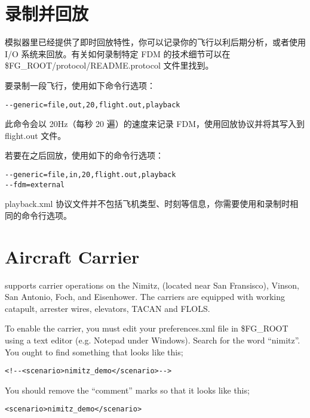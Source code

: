 \section{录制并回放}

模拟器里已经提供了即时回放特性，你可以记录你的飞行以利后期分析，或者使用 I/O 系统来回放。有关如何录制特定 FDM 的技术细节可以在 \$FG\_ROOT/protocol/README.protocol 文件里找到。

要录制一段飞行，使用如下命令行选项：

\begin{verbatim}
--generic=file,out,20,flight.out,playback
\end{verbatim}

此命令会以 20Hz（每秒 20 遍）的速度来记录 FDM，使用回放协议并将其写入到 flight.out 文件。

若要在之后回放，使用如下的命令行选项：

\begin{verbatim}
--generic=file,in,20,flight.out,playback
--fdm=external
\end{verbatim}

playback.xml 协议文件并不包括飞机类型、时刻等信息，你需要使用和录制时相同的命令行选项。

\fi

\iffalse
\section{Aircraft Carrier}\label{carrier}

\FlightGear{} supports carrier operations on the Nimitz, (located near San Fransisco), Vinson, San Antonio, Foch, and Eisenhower.
The carriers are equipped with working catapult, arrester wires, elevators, TACAN and FLOLS.

To enable the carrier, you must edit your preferences.xml file in \$FG\_ROOT using a text editor (e.g. Notepad
under Windows). Search for the word ``nimitz''. You ought to find something that looks like this;

\begin{verbatim}
<!--<scenario>nimitz_demo</scenario>-->
\end{verbatim}

You should remove the ``comment'' marks so that it looks like this;


\begin{verbatim}
<scenario>nimitz_demo</scenario>
\end{verbatim}

